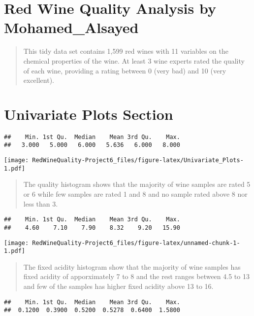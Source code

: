 \documentclass[]{article}
\title{}
\author{}
\date{}
\begin{document}
\hypertarget{red-wine-quality-analysis-by-mohamed_alsayed}{%
\section{Red Wine Quality Analysis by
Mohamed\_Alsayed}\label{red-wine-quality-analysis-by-mohamed_alsayed}}

\begin{quote}
This tidy data set contains 1,599 red wines with 11 variables on the
chemical properties of the wine. At least 3 wine experts rated the
quality of each wine, providing a rating between 0 (very bad) and 10
(very excellent).
\end{quote}

\hypertarget{univariate-plots-section}{%
\section{Univariate Plots Section}\label{univariate-plots-section}}

\begin{verbatim}
##    Min. 1st Qu.  Median    Mean 3rd Qu.    Max. 
##   3.000   5.000   6.000   5.636   6.000   8.000
\end{verbatim}

\texttt{[image: RedWineQuality-Project6\_files/figure-latex/Univariate\_Plots-1.pdf]}

\begin{quote}
The quality histogram shows that the majority of wine samples are rated
5 or 6 while few samples are rated 1 and 8 and no sample rated above 8
nor less than 3.
\end{quote}

\begin{verbatim}
##    Min. 1st Qu.  Median    Mean 3rd Qu.    Max. 
##    4.60    7.10    7.90    8.32    9.20   15.90
\end{verbatim}

\texttt{[image: RedWineQuality-Project6\_files/figure-latex/unnamed-chunk-1-1.pdf]}

\begin{quote}
The fixed acidity histogram show that the majority of wine samples has
fixed acidity of apporximately 7 to 8 and the rest ranges between 4.5 to
13 and few of the samples has higher fixed acidity above 13 to 16.
\end{quote}

\begin{verbatim}
##    Min. 1st Qu.  Median    Mean 3rd Qu.    Max. 
##  0.1200  0.3900  0.5200  0.5278  0.6400  1.5800
\end{verbatim}
\end{document}
